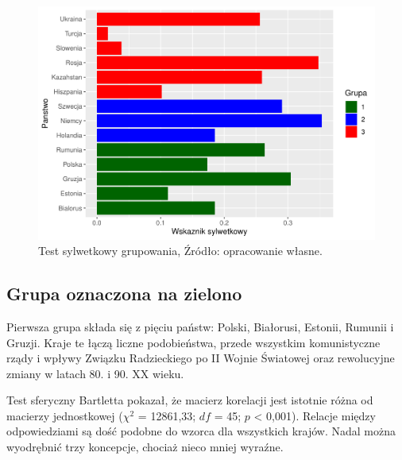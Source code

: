 \documentclass[12pt]{article}
\begin{document}
\begin{figure}

{\centering \includegraphics{text_ASA_files/figure-latex/silhouette-1} 

}

\caption{Test sylwetkowy grupowania, Źródło: opracowanie własne.}\label{fig:silhouette}
\end{figure}

\hypertarget{grupa-oznaczona-na-zielono}{%
\subsection{Grupa oznaczona na zielono}\label{grupa-oznaczona-na-zielono}}

Pierwsza grupa składa się z pięciu państw: Polski, Białorusi, Estonii, Rumunii i Gruzji. Kraje te łączą liczne podobieństwa, przede wszystkim komunistyczne rządy i wpływy Związku Radzieckiego po II Wojnie Światowej oraz rewolucyjne zmiany w latach 80. i 90. XX wieku.

Test sferyczny Bartletta pokazał, że macierz korelacji jest istotnie różna od macierzy jednostkowej (\(\chi^2\) = 12861,33; \(df\) = 45; \(p\) \textless{} 0,001). Relacje między odpowiedziami są dość podobne do wzorca dla wszystkich krajów. Nadal można wyodrębnić trzy koncepcje, chociaż nieco mniej wyraźne.
\end{document}

